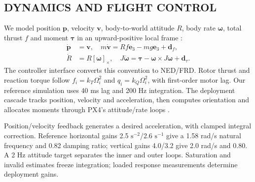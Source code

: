 \documentclass[a4paper,11pt]{article}
\begin{document}
\subsection{D{\fontsize{9.2}{14}\selectfont YNAMICS} {\fontsize{9.2}{14}\selectfont AND} {\fontsize{9.2}{14}\selectfont FLIGHT} {\fontsize{9.2}{14}\selectfont CONTROL}}
We model position $\boldsymbol p$, velocity $\boldsymbol v$, body-to-world attitude $R$, body rate $\boldsymbol\omega$, total thrust $f$ and moment $\boldsymbol\tau$ in an upward-positive local frame \cite{r40}:
\begin{equation}\begin{aligned}\dot{\boldsymbol p}&=\boldsymbol v,\quad m\dot{\boldsymbol v}=Rf\boldsymbol e_3-mg\boldsymbol e_3+\boldsymbol d_f,\\ \dot R&=R[\boldsymbol\omega]_\times,\quad J\dot{\boldsymbol\omega}=\boldsymbol\tau-\boldsymbol\omega\times J\boldsymbol\omega+\boldsymbol d_\tau.\end{aligned}\end{equation}
The controller interface converts this convention to NED/FRD. Rotor thrust and reaction torque follow $f_i=k_T\Omega_i^2$ and $q_i=k_Q\Omega_i^2$, with first-order motor lag. Our reference simulation uses 40 ms lag and 200 Hz integration. The deployment cascade tracks position, velocity and acceleration, then computes orientation and allocates moments through PX4's attitude/rate loops \cite{r42}.

Position/velocity feedback generates a desired acceleration, with clamped integral correction. Reference horizontal gains 2.5 $\mathrm{s}^{-2}$/2.6 $\mathrm{s}^{-1}$ give a 1.58 rad/s natural frequency and 0.82 damping ratio; vertical gains 4.0/3.2 give 2.0 rad/s and 0.80. A 2 Hz attitude target separates the inner and outer loops. Saturation and invalid estimates freeze integration; loaded response measurements determine deployment gains.
\end{document}
